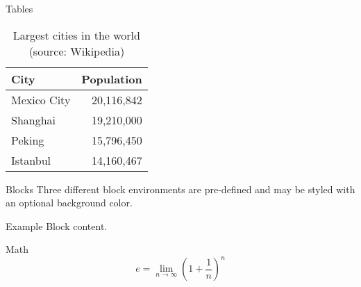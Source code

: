 \begin{frame}{Tables}
  \begin{table}
    \caption{Largest cities in the world (source: Wikipedia)}
    \begin{tabular}{lr}
      \toprule
      City        & Population \\
      \midrule
      Mexico City & 20,116,842 \\
      Shanghai    & 19,210,000 \\
      Peking      & 15,796,450 \\
      Istanbul    & 14,160,467 \\
      \bottomrule
    \end{tabular}
  \end{table}
\end{frame}
\begin{frame}{Blocks}
  Three different block environments are pre-defined and may be styled with an
  optional background color.







  \begin{exampleblock}{Example}
    Block content.
  \end{exampleblock}

\end{frame}
\begin{frame}{Math}
  \begin{equation*}
    e = \lim_{n\to \infty} \left(1 + \frac{1}{n}\right)^n
  \end{equation*}
\end{frame}
